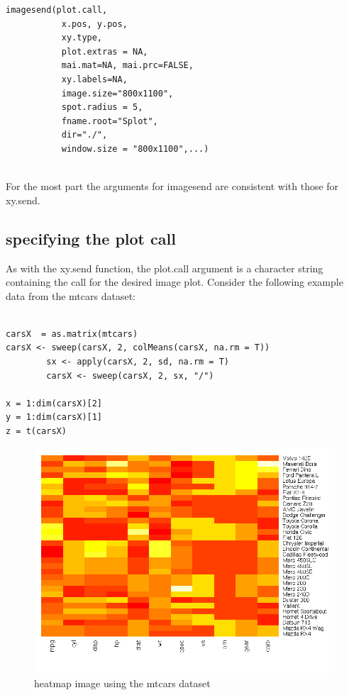 \documentclass[]{article}
\begin{document}
\begin{verbatim}
imagesend(plot.call, 
           x.pos, y.pos,
           xy.type,
           plot.extras = NA,
           mai.mat=NA, mai.prc=FALSE,
           xy.labels=NA,
           image.size="800x1100",
           spot.radius = 5,
           fname.root="Splot",
           dir="./",
           window.size = "800x1100",...)


\end{verbatim}

For the most part the arguments for imagesend are consistent with those for xy.send. 

\subsection{specifying the plot call}
As with the xy.send function, the plot.call argument is a character string containing the call for the desired image plot. Consider the following example data from the mtcars dataset:
\begin{verbatim}

carsX  = as.matrix(mtcars)
carsX <- sweep(carsX, 2, colMeans(carsX, na.rm = T))
        sx <- apply(carsX, 2, sd, na.rm = T)
        carsX <- sweep(carsX, 2, sx, "/")

x = 1:dim(carsX)[2]
y = 1:dim(carsX)[1]
z = t(carsX)
\end{verbatim}



\begin{center}
\begin{figure}
\includegraphics{exPlotImage}
\caption{heatmap image using the mtcars dataset}
\end{figure}
\end{center}
\end{document}
